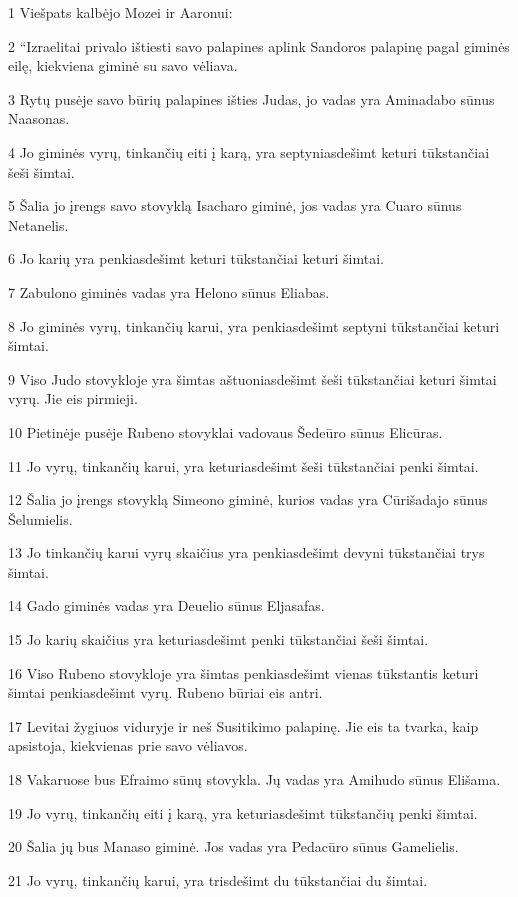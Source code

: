 \par 1 Viešpats kalbėjo Mozei ir Aaronui: 
\par 2 “Izraelitai privalo ištiesti savo palapines aplink Sandoros palapinę pagal giminės eilę, kiekviena giminė su savo vėliava. 
\par 3 Rytų pusėje savo būrių palapines išties Judas, jo vadas yra Aminadabo sūnus Naasonas. 
\par 4 Jo giminės vyrų, tinkančių eiti į karą, yra septyniasdešimt keturi tūkstančiai šeši šimtai. 
\par 5 Šalia jo įrengs savo stovyklą Isacharo giminė, jos vadas yra Cuaro sūnus Netanelis. 
\par 6 Jo karių yra penkiasdešimt keturi tūkstančiai keturi šimtai. 
\par 7 Zabulono giminės vadas yra Helono sūnus Eliabas. 
\par 8 Jo giminės vyrų, tinkančių karui, yra penkiasdešimt septyni tūkstančiai keturi šimtai. 
\par 9 Viso Judo stovykloje yra šimtas aštuoniasdešimt šeši tūkstančiai keturi šimtai vyrų. Jie eis pirmieji. 
\par 10 Pietinėje pusėje Rubeno stovyklai vadovaus Šedeūro sūnus Elicūras. 
\par 11 Jo vyrų, tinkančių karui, yra keturiasdešimt šeši tūkstančiai penki šimtai. 
\par 12 Šalia jo įrengs stovyklą Simeono giminė, kurios vadas yra Cūrišadajo sūnus Šelumielis. 
\par 13 Jo tinkančių karui vyrų skaičius yra penkiasdešimt devyni tūkstančiai trys šimtai. 
\par 14 Gado giminės vadas yra Deuelio sūnus Eljasafas. 
\par 15 Jo karių skaičius yra keturiasdešimt penki tūkstančiai šeši šimtai. 
\par 16 Viso Rubeno stovykloje yra šimtas penkiasdešimt vienas tūkstantis keturi šimtai penkiasdešimt vyrų. Rubeno būriai eis antri. 
\par 17 Levitai žygiuos viduryje ir neš Susitikimo palapinę. Jie eis ta tvarka, kaip apsistoja, kiekvienas prie savo vėliavos. 
\par 18 Vakaruose bus Efraimo sūnų stovykla. Jų vadas yra Amihudo sūnus Elišama. 
\par 19 Jo vyrų, tinkančių eiti į karą, yra keturiasdešimt tūkstančių penki šimtai. 
\par 20 Šalia jų bus Manaso giminė. Jos vadas yra Pedacūro sūnus Gamelielis. 
\par 21 Jo vyrų, tinkančių karui, yra trisdešimt du tūkstančiai du šimtai. 
